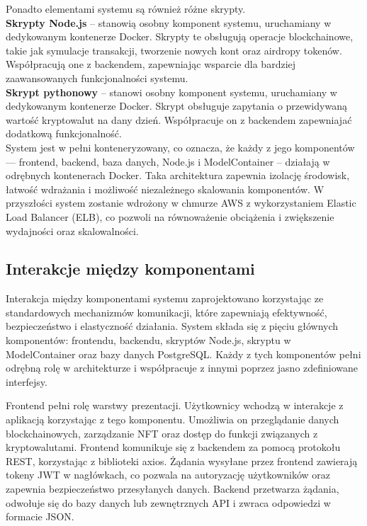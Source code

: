 \noindent Ponadto elementami systemu są również różne skrypty. \\[-10pt]

\noindent \textbf{Skrypty Node.js} -- stanowią osobny komponent systemu, uruchamiany w dedykowanym kontenerze Docker. Skrypty te obsługują operacje blockchainowe, takie jak symulacje transakcji, tworzenie nowych kont oraz airdropy tokenów. Współpracują one z backendem, zapewniając wsparcie dla bardziej zaawansowanych funkcjonalności systemu.\\[-10pt]

\noindent \textbf{Skrypt pythonowy} -- stanowi osobny komponent systemu, uruchamiany w dedykowanym kontenerze Docker. Skrypt obsługuje zapytania o przewidywaną wartość kryptowalut na dany dzień. Współpracuje on z backendem zapewniajać dodatkową funkcjonalność.\\[-10pt]

System jest w pełni konteneryzowany, co oznacza, że każdy z jego komponentów — frontend, backend, baza danych, Node.js i ModelContainer -- działają w odrębnych kontenerach Docker. Taka architektura zapewnia izolację środowisk, łatwość wdrażania i możliwość niezależnego skalowania komponentów. W przyszłości system zostanie wdrożony w chmurze AWS z wykorzystaniem Elastic Load Balancer (ELB), co pozwoli na równoważenie obciążenia i zwiększenie wydajności oraz skalowalności.

\subsection{Interakcje między komponentami}
Interakcja między komponentami systemu zaprojektowano korzystając ze standardowych mechanizmów komunikacji, które zapewniają efektywność, bezpieczeństwo i elastyczność działania. System składa się z pięciu głównych komponentów: frontendu, backendu, skryptów Node.js, skryptu w ModelContainer oraz bazy danych PostgreSQL. Każdy z tych komponentów pełni odrębną rolę w architekturze i współpracuje z innymi poprzez jasno zdefiniowane interfejsy.

Frontend pełni rolę warstwy prezentacji. Użytkownicy wchodzą w interakcje z aplikacją korzystając z tego komponentu. Umożliwia on przeglądanie danych blockchainowych, zarządzanie NFT oraz dostęp do funkcji związanych z kryptowalutami. Frontend komunikuje się z backendem za pomocą protokołu REST, korzystając z biblioteki axios. Żądania wysyłane przez frontend zawierają tokeny JWT w nagłówkach, co pozwala na autoryzację użytkowników oraz zapewnia bezpieczeństwo przesyłanych danych. Backend przetwarza żądania, odwołuje się do bazy danych lub zewnętrznych API i zwraca odpowiedzi w formacie JSON.

